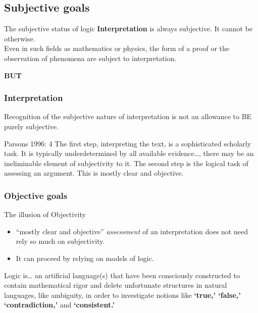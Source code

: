\documentclass{beamer}
\begin{document}
\subsection{Subjective goals}
\begin{frame}{The subjective status of logic}
\textbf{Interpretation} is always subjective. It cannot be otherwise. 
\\
Even in such fields as mathematics or physics, the form of a proof or the observation of phenomena are subject to interpretation.\\
\pause

{\bf BUT}

\end{frame}

\begin{frame}\frametitle{Interpretation}
Recognition of the subjective nature of interpretation is not an allowance to BE purely subjective. \pause
\begin{block}{Parsons 1996: 4}
The first step, interpreting the text, is a sophisticated scholarly task.  It is typically underdetermined by all available evidence\dots, there may be an ineliminable element of subjectivity to it.  The second step is the logical task of assessing an argument.  This is mostly clear and objective.  
\end{block}  
\end{frame}

\subsubsection{Objective goals}
\begin{frame}{The illusion of Objectivity}
\begin{itemize}
\item  ``mostly clear and objective'' \textsl{assessment} of an interpretation does not need rely so much on subjectivity. 
\item It can proceed by relying on models of logic.
\end{itemize}
\pause
\begin{block}{Logic is\ldots} 
an artificial language(s) that have been consciously constructed to contain mathematical rigor and delete unfortunate structures in natural languages, like ambiguity, in order to investigate notions like {\bf `true,' `false,' `contradiction,'} and {\bf `consistent.'}
\end{block}
\end{frame}
\end{document}
